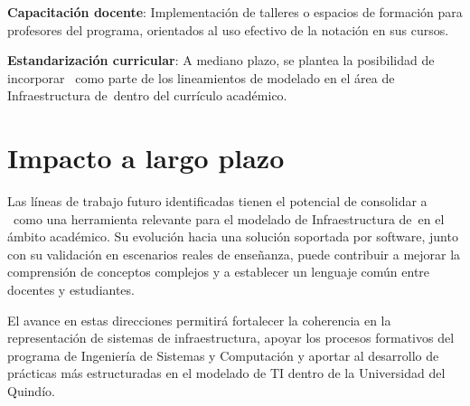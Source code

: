 \textbf{Capacitación docente}: Implementación de talleres o espacios de formación para profesores del programa, orientados al uso efectivo de la notación en sus cursos.

\textbf{Estandarización curricular}: A mediano plazo, se plantea la posibilidad de incorporar \NDITI~como parte de los lineamientos de modelado en el área de Infraestructura de~\TI dentro del currículo académico.

\section{Impacto a largo plazo}
\noindent

Las líneas de trabajo futuro identificadas tienen el potencial de consolidar a \NDITI~como una herramienta relevante para el modelado de Infraestructura de~\TI en el ámbito académico. Su evolución hacia una solución soportada por software, junto con su validación en escenarios reales de enseñanza, puede contribuir a mejorar la comprensión de conceptos complejos y a establecer un lenguaje común entre docentes y estudiantes.

El avance en estas direcciones permitirá fortalecer la coherencia en la representación de sistemas de infraestructura, apoyar los procesos formativos del programa de Ingeniería de Sistemas y Computación y aportar al desarrollo de prácticas más estructuradas en el modelado de TI dentro de la Universidad del Quindío.